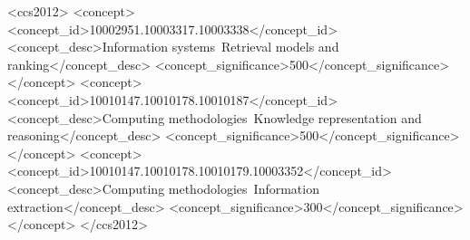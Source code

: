 \documentclass[sigconf, review, anonymous]{acmart}
\newcommand{\sys}{UNH}
\newcommand{\sysfull}{Unified Narrative Hypergraph}
\begin{document}







\begin{CCSXML}
<ccs2012>
   <concept>
       <concept_id>10002951.10003317.10003338</concept_id>
       <concept_desc>Information systems~Retrieval models and ranking</concept_desc>
       <concept_significance>500</concept_significance>
   </concept>
   <concept>
       <concept_id>10010147.10010178.10010187</concept_id>
       <concept_desc>Computing methodologies~Knowledge representation and reasoning</concept_desc>
       <concept_significance>500</concept_significance>
   </concept>
   <concept>
       <concept_id>10010147.10010178.10010179.10003352</concept_id>
       <concept_desc>Computing methodologies~Information extraction</concept_desc>
       <concept_significance>300</concept_significance>
   </concept>
</ccs2012>
\end{CCSXML}
\end{document}
